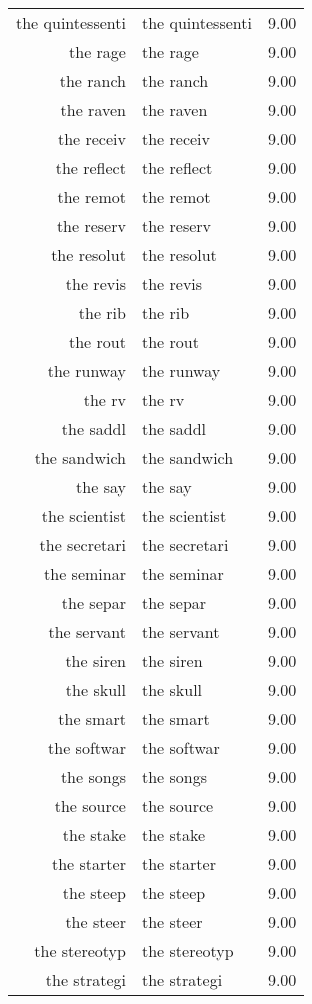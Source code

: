 \begin{table}[ht]
\begin{tabular}{rlr}
  the quintessenti & the quintessenti & 9.00 \\ 
  the rage & the rage & 9.00 \\ 
  the ranch & the ranch & 9.00 \\ 
  the raven & the raven & 9.00 \\ 
  the receiv & the receiv & 9.00 \\ 
  the reflect & the reflect & 9.00 \\ 
  the remot & the remot & 9.00 \\ 
  the reserv & the reserv & 9.00 \\ 
  the resolut & the resolut & 9.00 \\ 
  the revis & the revis & 9.00 \\ 
  the rib & the rib & 9.00 \\ 
  the rout & the rout & 9.00 \\ 
  the runway & the runway & 9.00 \\ 
  the rv & the rv & 9.00 \\ 
  the saddl & the saddl & 9.00 \\ 
  the sandwich & the sandwich & 9.00 \\ 
  the say & the say & 9.00 \\ 
  the scientist & the scientist & 9.00 \\ 
  the secretari & the secretari & 9.00 \\ 
  the seminar & the seminar & 9.00 \\ 
  the separ & the separ & 9.00 \\ 
  the servant & the servant & 9.00 \\ 
  the siren & the siren & 9.00 \\ 
  the skull & the skull & 9.00 \\ 
  the smart & the smart & 9.00 \\ 
  the softwar & the softwar & 9.00 \\ 
  the songs & the songs & 9.00 \\ 
  the source & the source & 9.00 \\ 
  the stake & the stake & 9.00 \\ 
  the starter & the starter & 9.00 \\ 
  the steep & the steep & 9.00 \\ 
  the steer & the steer & 9.00 \\ 
  the stereotyp & the stereotyp & 9.00 \\ 
  the strategi & the strategi & 9.00 \\ 

\end{tabular}
\end{table}

